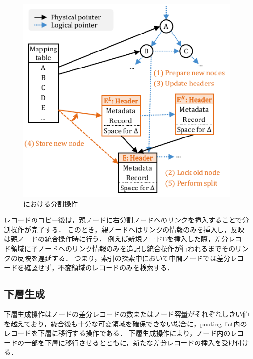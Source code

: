 \begin{figure}[t]
    \centering
    \includegraphics{./figures/Bc-split.pdf}
    \caption{\Bcforest{}における分割操作}
    \label{fig:bc_tree_split}
\end{figure}

レコードのコピー後は，親ノードに右分割ノードへのリンクを挿入することで分割操作が完了する．
このとき，親ノードへはリンクの情報のみを挿入し，反映は親ノードの統合操作時に行う．
例えば新規ノードEを挿入した際，差分レコード領域に子ノードへのリンク情報のみを追記し統合操作が行われるまでそのリンクの反映を遅延する．
つまり，索引の探索中において中間ノードでは差分レコードを確認せず，不変領域のレコードのみを検索する．

\subsection{下層生成}
下層生成操作はノードの差分レコードの数またはノード容量がそれぞれしきい値を越えており，統合後も十分な可変領域を確保できない場合に，posting list内のレコードを下層に移行する操作である．
下層生成操作により，ノード内のレコードの一部を下層に移行させるとともに，新たな差分レコードの挿入を受け付ける．

